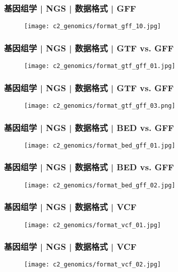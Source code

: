 \begin{frame}
  \frametitle{基因组学 | NGS | 数据格式 | GFF}
  \begin{figure}
    \centering
    \texttt{[image: c2\_genomics/format\_gff\_10.jpg]}
  \end{figure}
\end{frame}
    
\begin{frame}
  \frametitle{基因组学 | NGS | 数据格式 | GTF vs. GFF}
  \begin{figure}
    \centering
    \texttt{[image: c2\_genomics/format\_gtf\_gff\_01.jpg]}
  \end{figure}
\end{frame}

\begin{frame}
  \frametitle{基因组学 | NGS | 数据格式 | GTF vs. GFF}
  \begin{figure}
    \centering
    \texttt{[image: c2\_genomics/format\_gtf\_gff\_03.png]}
  \end{figure}
\end{frame}

\begin{frame}
  \frametitle{基因组学 | NGS | 数据格式 | BED vs. GFF}
  \begin{figure}
    \centering
    \texttt{[image: c2\_genomics/format\_bed\_gff\_01.jpg]}
  \end{figure}
\end{frame}
    
\begin{frame}
  \frametitle{基因组学 | NGS | 数据格式 | BED vs. GFF}
  \begin{figure}
    \centering
    \texttt{[image: c2\_genomics/format\_bed\_gff\_02.jpg]}
  \end{figure}
\end{frame}
    
\begin{frame}
  \frametitle{基因组学 | NGS | 数据格式 | VCF}
  \begin{figure}
    \centering
    \texttt{[image: c2\_genomics/format\_vcf\_01.jpg]}
  \end{figure}
\end{frame}
    
\begin{frame}
  \frametitle{基因组学 | NGS | 数据格式 | VCF}
  \begin{figure}
    \centering
    \texttt{[image: c2\_genomics/format\_vcf\_02.jpg]}
  \end{figure}
\end{frame}
    
